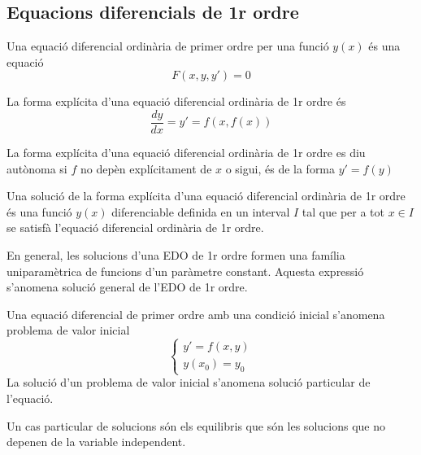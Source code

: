 \documentclass[../main.tex]{subfiles}
\begin{document}
\subsection{Equacions diferencials de 1r ordre}
\begin{definicio}
    Una equació diferencial ordinària de primer ordre per una funció $y(x)$ és una equació 
    \begin{displaymath}
        F(x,y,y') = 0
    \end{displaymath}
\end{definicio}
\begin{definicio}
    La forma explícita d'una equació diferencial ordinària de 1r ordre és
    \begin{displaymath}
        \frac{dy}{dx} = y' = f\left(x, f\left(x\right)\right)
    \end{displaymath}
\end{definicio}
\begin{definicio}
    La forma explícita d'una equació diferencial ordinària de 1r ordre es diu autònoma si $f$ no
    depèn explícitament de $x$ o sigui, és de la forma $y' = f(y)$
\end{definicio}
\begin{definicio}
    Una solució de la forma explícita d'una equació diferencial ordinària de 1r ordre és una funció
    $y(x)$ diferenciable definida en un interval $I$ tal que per a tot $x \in I$ se satisfà
    l'equació diferencial ordinària de 1r ordre.
\end{definicio}
En general, les solucions d'una EDO de 1r ordre formen una família uniparamètrica de funcions d'un
paràmetre constant. Aquesta expressió s'anomena solució general de l'EDO de 1r ordre.
\begin{definicio}
    Una equació diferencial de primer ordre amb una condició inicial s'anomena problema de valor inicial
    \begin{displaymath}
        \begin{cases}
            y' = f(x, y)\\
            y(x_0) = y_0
        \end{cases}
    \end{displaymath}
    La solució d'un problema de valor inicial s'anomena solució particular de l'equació.
\end{definicio}
\begin{definicio}
    Un cas particular de solucions són els equilibris que són les solucions que no depenen de la
    variable independent.
\end{definicio}
\end{document}
